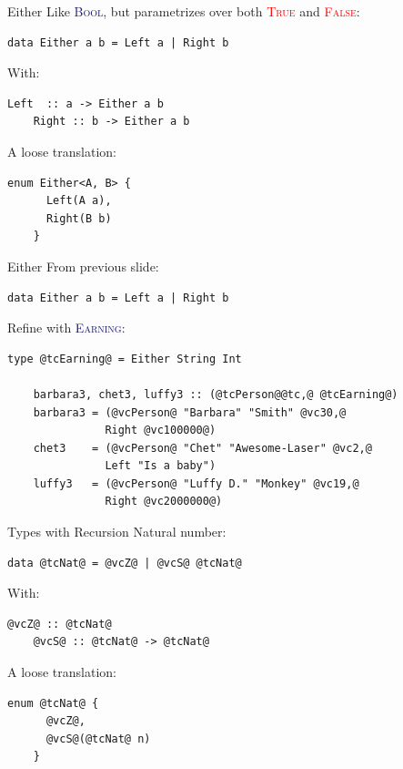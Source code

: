 \documentclass[xcolor={usenames,dvipsnames}]{beamer}
\newcommand{\htycon}[1]{\textcolor{MidnightBlue}{\textsc{#1}}}
\newcommand{\hvalcon}[1]{\textcolor{Red}{\textsc{#1}}}
\begin{document}
\begin{frame}[fragile]{Either}
  Like \htycon{Bool}, but parametrizes over both \hvalcon{True} and \hvalcon{False}:
  \begin{lstlisting}[style=hask]
    data Either a b = Left a | Right b
  \end{lstlisting}

  \pause
  With:
  \begin{lstlisting}[style=hask]
    Left  :: a -> Either a b
    Right :: b -> Either a b
  \end{lstlisting}

  \pause
  A loose translation:
  \begin{lstlisting}[style=hask]
    enum Either<A, B> {
      Left(A a),
      Right(B b)
    }
  \end{lstlisting}
\end{frame}

\begin{frame}[fragile]{Either}
  From previous slide:
  \begin{lstlisting}[style=hask]
    data Either a b = Left a | Right b
  \end{lstlisting}

  \pause
  Refine with \htycon{Earning}:
  \begin{lstlisting}[style=hask]
    type @tcEarning@ = Either String Int

    barbara3, chet3, luffy3 :: (@tcPerson@@tc,@ @tcEarning@)
    barbara3 = (@vcPerson@ "Barbara" "Smith" @vc30,@
               Right @vc100000@)
    chet3    = (@vcPerson@ "Chet" "Awesome-Laser" @vc2,@
               Left "Is a baby") 
    luffy3   = (@vcPerson@ "Luffy D." "Monkey" @vc19,@
               Right @vc2000000@)
  \end{lstlisting}
\end{frame}

\begin{frame}[fragile]{Types with Recursion}
  Natural number:
  \begin{lstlisting}[style=hask]
    data @tcNat@ = @vcZ@ | @vcS@ @tcNat@
  \end{lstlisting}

  With:
  \begin{lstlisting}[style=hask]
    @vcZ@ :: @tcNat@
    @vcS@ :: @tcNat@ -> @tcNat@
  \end{lstlisting}

  \pause
  A loose translation:
  \begin{lstlisting}[style=hask]
    enum @tcNat@ {
      @vcZ@,
      @vcS@(@tcNat@ n)
    }
  \end{lstlisting}
\end{frame}
\end{document}
